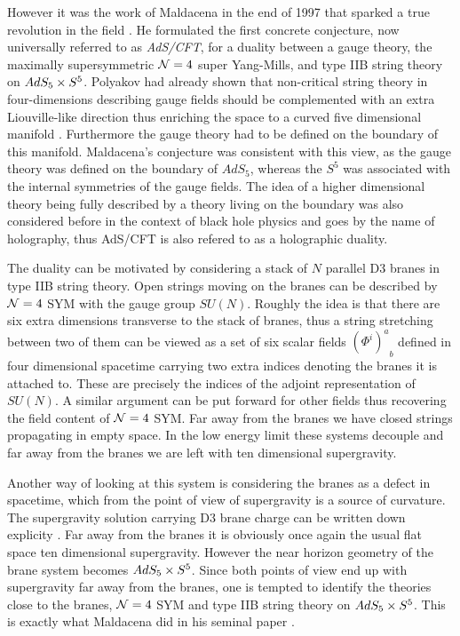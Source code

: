 However it was the work of Maldacena in the end of 1997 that sparked a true revolution in the field \cite{Maldacena:1997re}. 
He formulated the first concrete conjecture, now universally referred to as \emph{AdS/CFT}, for a duality between a gauge theory, the maximally supersymmetric $\mathcal{N}=4$ super Yang-Mills, and type IIB string theory on $AdS_5 \times S^5$. 
Polyakov had already shown that non-critical string theory in four-dimensions describing gauge fields should be complemented with an extra Liouville-like direction thus enriching the space to a curved five dimensional manifold \cite{Polyakov:1997tj}. Furthermore the gauge theory had to be defined on the boundary of this manifold.
Maldacena's conjecture was consistent with this view, as the gauge theory was defined on the boundary of $AdS_5$, whereas the $S^5$ was associated with the internal symmetries of the gauge fields.
The idea of a higher dimensional theory being fully described by a theory living on the boundary was also considered before in the context of black hole physics \cite{'tHooft:1993gx, Susskind:1994vu} and goes by the name of holography, thus AdS/CFT is also refered to as a holographic duality.

The duality can be motivated by considering a stack of $N$ parallel D3 branes in type IIB string theory. 
Open strings moving on the branes can be described by $\mathcal{N}=4$ SYM with the gauge group $SU(N)$. 
Roughly the idea is that there are six extra dimensions transverse to the stack of branes, thus a string stretching between two of them can be viewed as a set of six scalar fields ${(\Phi^i)^a}_b$ defined in four dimensional spacetime carrying two extra indices denoting the branes it is attached to. 
These are precisely the indices of the adjoint representation of $SU(N)$.
A similar argument can be put forward for other fields thus recovering the field content of $\mathcal{N}=4$ SYM.
Far away from the branes we have closed strings propagating in empty space. 
In the low energy limit these systems decouple and far away from the branes we are left with ten dimensional supergravity.

Another way of looking at this system is considering the branes as a defect in spacetime, which from the point of view of supergravity is a source of curvature. 
The supergravity solution carrying D3 brane charge can be written down explicity \cite{Horowitz:1991cd}.
Far away from the branes it is obviously once again the usual flat space ten dimensional supergravity.
However the near horizon geometry of the brane system becomes $AdS_5 \times S^5$.
Since both points of view end up with supergravity far away from the branes, one is tempted to identify the theories close to the branes, $\mathcal{N}=4$ SYM and type IIB string theory on $AdS_5 \times S^5$. 
This is exactly what Maldacena did in his seminal paper \cite{Maldacena:1997re}. 

